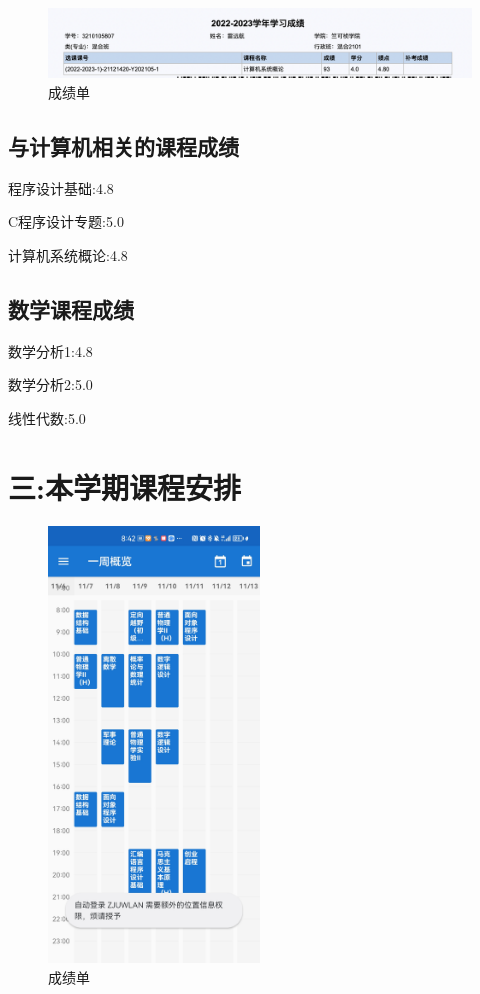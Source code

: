 \documentclass{article}
\begin{document}
    \begin{figure}[H]
    \centering
    \includegraphics[width=1\textwidth]{6.png}
    \caption{\label{总结}成绩单}
    \end{figure}

\subsection*{与计算机相关的课程成绩}
程序设计基础:4.8

C程序设计专题:5.0

计算机系统概论:4.8

\subsection*{数学课程成绩}

数学分析1:4.8

数学分析2:5.0

线性代数:5.0

\section*{三:本学期课程安排}
    \begin{figure}[H]
    \centering
    \includegraphics[width=0.5\textwidth]{7.jpg}
    \caption{\label{总结}成绩单}
    \end{figure}
\end{document}
